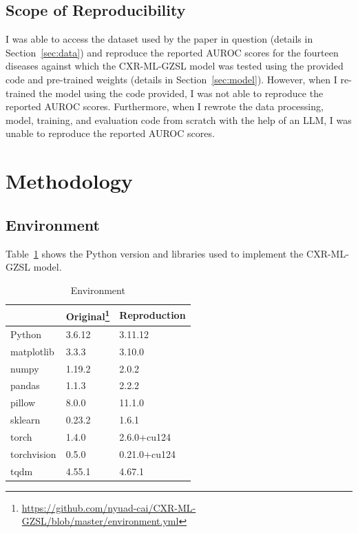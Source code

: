 \documentclass[letterpaper]{article} %
\begin{document}
\subsection{Scope of Reproducibility}

I was able to access the dataset used by the paper in question (details in Section~\ref{sec:data}) and reproduce the reported AUROC scores for the fourteen diseases against which the CXR-ML-GZSL model was tested using the provided code and pre-trained weights (details in Section~\ref{sec:model}). However, when I re-trained the model using the code provided, I was not able to reproduce the reported AUROC scores. Furthermore, when I rewrote the data processing, model, training, and evaluation code from scratch with the help of an LLM, I was unable to reproduce the reported AUROC scores.

\section{Methodology}

\subsection{Environment}

Table~\ref{tab:environment} shows the Python version and libraries used to implement the CXR-ML-GZSL model.

\begin{table}[h!]
\centering
\begin{tabular}{|l|l|l|}
\hline
\textbf{} & \textbf{Original\footnote{\url{https://github.com/nyuad-cai/CXR-ML-GZSL/blob/master/environment.yml}}} & \textbf{Reproduction} \\
\hline
Python & 3.6.12 & 3.11.12 \\
matplotlib & 3.3.3 & 3.10.0 \\
numpy & 1.19.2 & 2.0.2 \\
pandas & 1.1.3 & 2.2.2 \\
pillow & 8.0.0 & 11.1.0 \\
sklearn & 0.23.2 & 1.6.1 \\
torch & 1.4.0 & 2.6.0+cu124 \\
torchvision & 0.5.0 & 0.21.0+cu124 \\
tqdm & 4.55.1 & 4.67.1 \\
\hline
\end{tabular}
\caption{Environment}
\label{tab:environment}
\end{table}
\end{document}
